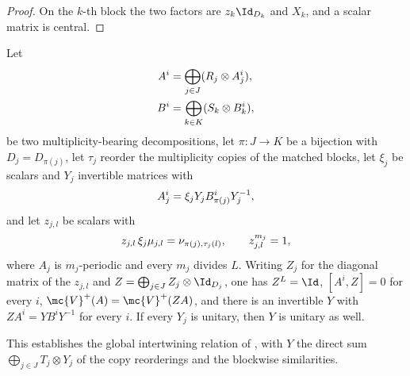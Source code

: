 \begin{proof}\leanok
    On the $k$-th block the two factors are $z_k\Id_{D_k}$ and $X_k$, and a
    scalar matrix is central.
\end{proof}

\begin{lemma}%
    \label{thm:periodic_equalcase_global_zgauge}
    \leanok
    Let
    \begin{align}
        A^i & =\bigoplus_{j\in J}(R_j\otimes A_j^i),
        \notag                                       \\
        B^i & =\bigoplus_{k\in K}(S_k\otimes B_k^i),
        \notag
    \end{align}
    be two multiplicity-bearing decompositions, let $\pi\colon J\to K$ be a
    bijection with $D_j=D_{\pi(j)}$, let $\tau_j$ reorder the multiplicity
    copies of the matched blocks, let $\xi_j$ be scalars and $Y_j$ invertible
    matrices with
    \begin{align}
        A_j^i=\xi_jY_jB_{\pi(j)}^iY_j^{-1},
        \notag
    \end{align}
    and let $z_{j,l}$ be scalars with
    \begin{align}
        z_{j,l}\,\xi_j\mu_{j,l}=\nu_{\pi(j),\tau_j(l)},
        \qquad z_{j,l}^{m_j}=1,
        \notag
    \end{align}
    where $A_j$ is $m_j$-periodic and every $m_j$ divides $L$. Writing $Z_j$
    for the diagonal matrix of the $z_{j,l}$ and
    $Z=\bigoplus_{j\in J}Z_j\otimes\Id_{D_j}$, one has $Z^L=\Id$,
    $[A^i,Z]=0$ for every $i$, $\mc{V}^+(A)=\mc{V}^+(ZA)$, and there is an
    invertible $Y$ with $ZA^i=YB^iY^{-1}$ for every $i$.
    If every $Y_j$ is unitary, then $Y$ is unitary as well.

    This establishes the global intertwining relation of
    \cite[lines~689--690]{DeLasCuevas2017Irreducible}, with $Y$ the direct sum
    $\bigoplus_{j\in J} T_j\otimes Y_j$ of the copy reorderings and the
    blockwise similarities.
\end{lemma}

